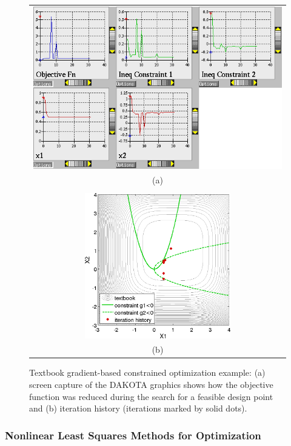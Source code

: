 \begin{figure}[ht!]
  \centering
  \begin{tabular}{c}
  \includegraphics[width=\textwidth]{images/textbook_opt_hist}\\
  (a)\\
  \qquad\\
  \includegraphics[height=2.5in]{images/textbook_history} \\
  (b)
  \end{tabular}
  \caption{Textbook gradient-based constrained optimization example:
    (a) screen capture of the DAKOTA graphics shows how the objective
    function was reduced during the search for a feasible design point
    and (b) iteration history (iterations marked by solid dots).}
  \label{tutorial:textbook_grad_constr_graphics}
\end{figure}

\subsubsection{Nonlinear Least Squares Methods for Optimization}\label{tutorial:example:nonlinear}

